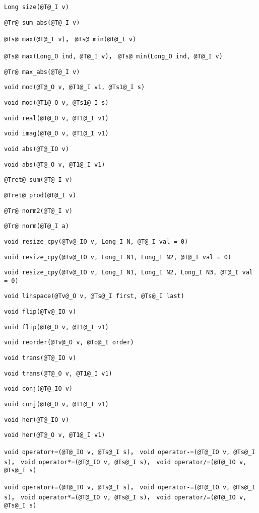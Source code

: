 
\begin{issues}
\issueDraft
\end{issues}

\verb|Long size(@T@_I v)|

\verb|@Tr@ sum_abs(@T@_I v)|

\verb|@Ts@ max(@T@_I v)|， \verb|@Ts@ min(@T@_I v)|

\verb|@Ts@ max(Long_O ind, @T@_I v)|， \verb|@Ts@ min(Long_O ind, @T@_I v)|

\verb|@Tr@ max_abs(@T@_I v)|

\verb|void mod(@T@_O v, @T1@_I v1, @Ts1@_I s)|

\verb|void mod(@T1@_O v, @Ts1@_I s)|

\verb|void real(@T@_O v, @T1@_I v1)|

\verb|void imag(@T@_O v, @T1@_I v1)|

\verb|void abs(@T@_IO v)|

\verb|void abs(@T@_O v, @T1@_I v1)|

\verb|@Tret@ sum(@T@_I v)|

\verb|@Tret@ prod(@T@_I v)|

\verb|@Tr@ norm2(@T@_I v)|

\verb|@Tr@ norm(@T@_I a)|

\verb|void resize_cpy(@Tv@_IO v, Long_I N, @T@_I val = 0)|

\verb|void resize_cpy(@Tv@_IO v, Long_I N1, Long_I N2, @T@_I val = 0)|

\verb|void resize_cpy(@Tv@_IO v, Long_I N1, Long_I N2, Long_I N3, @T@_I val = 0)|

\verb|void linspace(@Tv@_O v, @Ts@_I first, @Ts@_I last)|

\verb|void flip(@Tv@_IO v)|

\verb|void flip(@T@_O v, @T1@_I v1)|

\verb|void reorder(@Tv@_O v, @To@_I order)|

\verb|void trans(@T@_IO v)|

\verb|void trans(@T@_O v, @T1@_I v1)|

\verb|void conj(@T@_IO v)|

\verb|void conj(@T@_O v, @T1@_I v1)|

\verb|void her(@T@_IO v)|

\verb|void her(@T@_O v, @T1@_I v1)|

\verb|void operator+=(@T@_IO v, @Ts@_I s)|， \verb|void operator-=(@T@_IO v, @Ts@_I s)|， \verb|void operator*=(@T@_IO v, @Ts@_I s)|， \verb|void operator/=(@T@_IO v, @Ts@_I s)|

\verb|void operator+=(@T@_IO v, @Ts@_I s)|， \verb|void operator-=(@T@_IO v, @Ts@_I s)|， \verb|void operator*=(@T@_IO v, @Ts@_I s)|， \verb|void operator/=(@T@_IO v, @Ts@_I s)|



